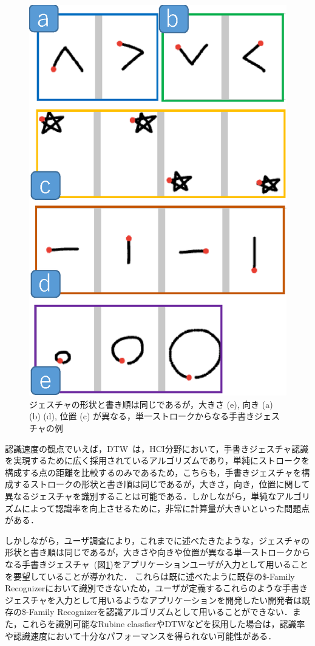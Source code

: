 \begin{figure} [htbp]
\centering
\includegraphics [width=0.5\columnwidth]{img/examples_V.eps}
\caption{ジェスチャの形状と書き順は同じであるが，大きさ (e), 向き (a) (b) (d), 位置 (c) が異なる，単一ストロークからなる手書きジェスチャの例}
\label{fig:examples_V}
\end{figure}


認識速度の観点でいえば，DTW~\cite{Tappert:1982:CSR:1664966.1664979, Salvador:2007:TAD:1367985.1367993}は，HCI分野において，手書きジェスチャ認識を実現するために広く採用されているアルゴリズムであり，単純にストロークを構成する点の距離を比較するのみであるため，こちらも，手書きジェスチャを構成するストロークの形状と書き順は同じであるが，大きさ，向き，位置に関して異なるジェスチャを識別することは可能である．しかしながら，単純なアルゴリズムによって認識率を向上させるために，非常に計算量が大きいといった問題点がある．

しかしながら，ユーザ調査により，これまでに述べたきたような，ジェスチャの形状と書き順は同じであるが，大きさや向きや位置が異なる単一ストロークからなる手書きジェスチャ~(図\ref{fig:examples_V})をアプリケーションユーザが入力として用いることを要望していることが導かれた．
これらは既に述べたように既存の\$-Family Recognizerにおいて識別できないため，ユーザが定義するこれらのような手書きジェスチャを入力として用いるようなアプリケーションを開発したい開発者は既存の\$-Family Recognizerを認識アルゴリズムとして用いることができない．また，これらを識別可能なRubine classfierやDTWなどを採用した場合は，認識率や認識速度において十分なパフォーマンスを得られない可能性がある．


